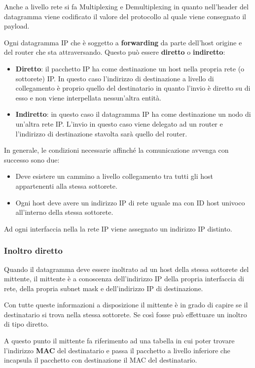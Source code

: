 Anche a livello rete si fa Multiplexing e Demultiplexing in quanto
nell'header del datagramma viene codificato il valore del protocollo 
al quale viene consegnato il payload.

Ogni datagramma IP che è soggetto a \textbf{forwarding} da parte 
dell'host origine e del router che sta attraversando. Questo può 
essere \textbf{diretto} o \textbf{indiretto}:
\begin{itemize}
	\item \textbf{Diretto}: il pacchetto IP ha come destinazione un
		host nella propria rete (o sottorete) IP. In questo caso 
		l'indirizzo di destinazione a livello di collegamento è 
		proprio quello del destinatario in quanto l'invio è diretto 
		su di esso e non viene interpellata nessun'altra entità.
	\item \textbf{Indiretto}: in questo caso il datagramma IP ha come 
		destinazione un nodo di un'altra rete IP. L'invio in questo
		caso viene delegato ad un router e l'indirizzo di destinazione
		stavolta sarà quello del router.
\end{itemize}
In generale, le condizioni necessarie affinché la comunicazione 
avvenga con successo sono due:
\begin{itemize}
	\item Deve esistere un cammino a livello collegamento tra tutti 
		gli host appartenenti alla stessa sottorete.
	\item Ogni host deve avere un indirizzo IP di rete uguale ma con
		ID host univoco all'interno della stessa sottorete.
\end{itemize}
Ad ogni interfaccia nella la rete IP viene assegnato un indirizzo IP 
distinto.

\subsubsection{Inoltro diretto}
Quando il datagramma deve essere inoltrato ad un host della stessa 
sottorete del mittente, il mittente è a conoscenza dell'indirizzo IP
della propria interfaccia di rete, della propria subnet mask e 
dell'indirizzo IP di destinazione.

Con tutte queste informazioni a disposizione il mittente è in grado di
capire se il destinatario si trova nella stessa sottorete. Se così
fosse può effettuare un inoltro di tipo diretto.

A questo punto il mittente fa riferimento ad una tabella in cui poter
trovare l'indirizzo \textbf{MAC} del destinatario e passa il pacchetto
a livello inferiore che incapsula il pacchetto con destinazione il 
MAC del destinatario.

